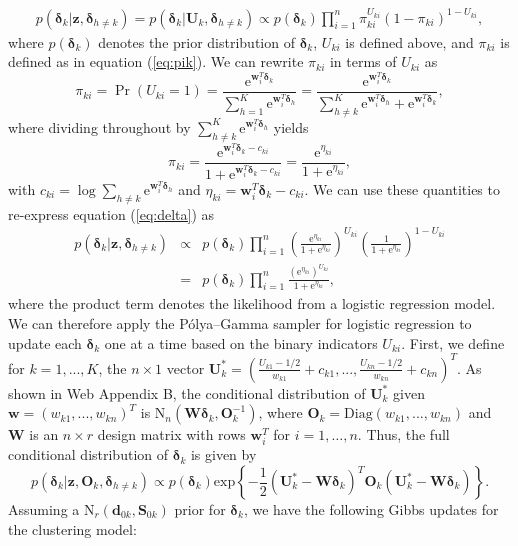 \documentclass[useAMS,usenatbib,referee]{biom}
\begin{document}
\begin{eqnarray}
p(\boldsymbol\delta_k|\mathbf{z},\boldsymbol\delta_{h \ne k})= p(\boldsymbol\delta_k|\mathbf{U}_k,\boldsymbol\delta_{h \ne k})\propto p(\boldsymbol\delta_k) \prod_{i = 1}^{n} \pi_{ki}^{U_{ki}}(1-\pi_{ki})^{1-U_{ki}}, \label{eq:delta}
\end{eqnarray}
where $p(\boldsymbol\delta_k)$ denotes the prior distribution of $\boldsymbol\delta_k$, $U_{ki}$ is defined above, and $\pi_{ki}$ is defined as in equation (\ref{eq:pik}). We can rewrite $\pi_{ki}$ in terms of $U_{ki}$ as
\[
\pi_{ki} = \Pr(U_{ki} = 1) = \frac{\text{e}^{\mathbf{w}_i^T \boldsymbol\delta_k}}{\sum_{h = 1}^K \text{e}^{\mathbf{w}_i^T \boldsymbol\delta_h}}= \frac{\text{e}^{\mathbf{w}_i^T \boldsymbol\delta_k}}{\sum_{h \ne k}^K \text{e}^{\mathbf{w}_i^T \boldsymbol\delta_h} + \text{e}^{\mathbf{w}_i^T \boldsymbol\delta_k}},
\]
where dividing throughout by $\sum_{h \ne k}^K \text{e}^{\mathbf{w}_i^T \boldsymbol\delta_h}$ yields
\[
\pi_{ki} = \frac{\text{e}^{\mathbf{w}_i^T \boldsymbol\delta_k - {c}_{ki}}}{1 + \text{e}^{\mathbf{w}_i^T \boldsymbol\delta_k - {c}_{ki}}} = \frac{\text{e}^{\eta_{ki}}}{1 + \text{e}^{\eta_{ki}}},
\]
with ${c}_{ki} = \log \sum_{h \ne k} \text{e}^{\mathbf{w}_i^T \boldsymbol\delta_{h}}$ and $\eta_{ki} = \mathbf{w}_i^T \boldsymbol\delta_k - {c}_{ki}$. We can use these quantities to re-express equation (\ref{eq:delta}) as
\begin{eqnarray}
	p(\boldsymbol\delta_k|\mathbf{z},\boldsymbol\delta_{h \ne k}) &\propto& p(\boldsymbol\delta_k) \prod_{i = 1}^{n} \left (\frac{\text{e}^{\eta_{ki}}}{1 + \text{e}^{\eta_{ki}}} \right )^{U_{ki}} \left (\frac{1}{1 + \text{e}^{\eta_{ki}}} \right )^{1-U_{ki}} \nonumber\\ &=& p(\boldsymbol\delta_k) \prod_{i = 1}^n \frac{(\text{e}^{\eta_{ki}})^{U_{ki}}}{1 + \text{e}^{\eta_{ki}}}, \label{eq:pglogit}
\end{eqnarray}
where the product term denotes the likelihood from a logistic regression model. We can therefore apply the P\'olya--Gamma sampler for logistic regression to update each $\boldsymbol\delta_k$ one at a time based on the binary indicators $U_{ki}$. First, we define for $k = 1,...,K$, the $n \times 1$ vector $\mathbf{U}^*_{k} = \left( \frac{U_{k1}-1/2}{w_{k1}} + c_{k1},...,\frac{U_{kn}-1/2}{w_{kn}} + c_{kn} \right )^T$. As shown in Web Appendix B, the conditional distribution of $\mathbf{U}^*_{k}$ given $\boldsymbol{w} = (w_{k1},...,w_{kn})^T$ is $\text{N}_n (\mathbf{W}\boldsymbol\delta_k,\mathbf{O}_k^{-1})$, where $\mathbf{O}_k = \text{Diag}(w_{k1},...,w_{kn})$ and $\mathbf{W}$ is an $n\times r$ design matrix with rows $\mathbf{w}^T_i$ for $i=1,\ldots,n$. Thus, the full conditional distribution of $\boldsymbol\delta_k$ is given by
\begin{equation}
	p(\boldsymbol\delta_k|\mathbf{z}, \mathbf{O}_k, \boldsymbol\delta_{h \ne k}) \propto p(\boldsymbol\delta_k) \text{exp} \left \{ - \frac{1}{2} (\mathbf{U}^*_k - \mathbf{W}\boldsymbol\delta_k)^T \mathbf{O}_k (\mathbf{U}^*_k - \mathbf{W}\boldsymbol\delta_k)\right \}.
\end{equation}
Assuming a $\text{N}_r(\mathbf{d}_{0k},\mathbf{S}_{0k})$ prior for $\boldsymbol\delta_k$, we have the following Gibbs updates for the clustering model:
\end{document}
